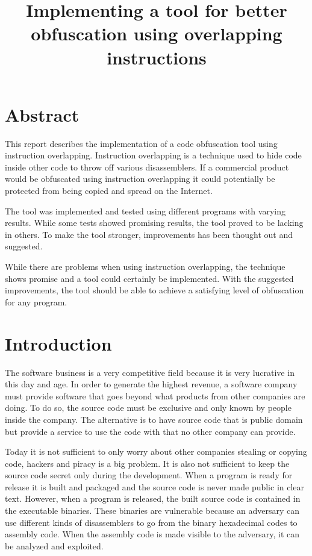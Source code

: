 \documentclass[11pt,twoside]{eitExjobb}
\title{Implementing a tool for better obfuscation using overlapping instructions}
\begin{document}
\Date{\today}
\MakeTitlePage
\frontmatter
\chapter*{Abstract}
This report describes the implementation of a code obfuscation tool using instruction overlapping. Instruction overlapping is a technique used to hide code inside other code to throw off various disassemblers. If a commercial product would be obfuscated using instruction overlapping it could potentially be protected from being copied and spread on the Internet.

The tool was implemented and tested using different programs with varying results. While some tests showed promising results, the tool proved to be lacking in others. To make the tool stronger, improvements has been thought out and suggested.

While there are problems when using instruction overlapping, the technique shows promise and a tool could certainly be implemented. With the suggested improvements, the tool should be able to achieve a satisfying level of obfuscation for any program. 

\tableofcontents
\listoffigures
\listoftables
\cleardoublepage
\mainmatter

\chapter{Introduction}
The software business is a very competitive field because it is very lucrative in this day and age. In order to generate the highest revenue, a software company must provide software that goes beyond what products from other companies are doing. To do so, the source code must be exclusive and only known by people inside the company. The alternative is to have source code that is public domain but provide a service to use the code with that no other company can provide. 

Today it is not sufficient to only worry about other companies stealing or copying code, hackers and piracy is a big problem. It is also not sufficient to keep the source code secret only during the development. When a program is ready for release it is built and packaged and the source code is never made public in clear text. However, when a program is released, the built source code is contained in the executable binaries. These binaries are vulnerable because an adversary can use different kinds of disassemblers to go from the binary hexadecimal codes to assembly code. When the assembly code is made visible to the adversary, it can be analyzed and exploited. 
\end{document}
